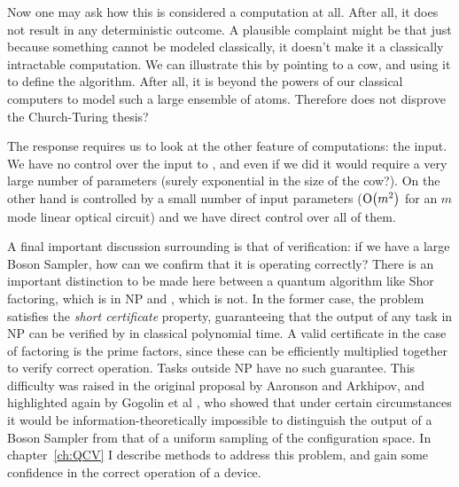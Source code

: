 Now one may ask how this is considered a computation at all.
After all, it does not result in any deterministic outcome. A plausible
complaint might be that just because something cannot be modeled classically,
it doesn't make it a classically intractable computation. We can illustrate
this by pointing to a cow, and using it to define the  algorithm.
After all, it is beyond the powers of our classical computers to model such a
large ensemble of atoms. Therefore does  not disprove the
Church-Turing thesis?

The response requires us to look at the other feature of computations: the
input. We have no control over the input to , and even if we did it
would require a very large number of parameters (surely exponential in the size
of the cow?). On the other hand \bosonsampling{} is controlled by a small number
of input parameters (\(\mathrm{O} \!\left(m^{2}\right)\) for an \(m\) mode linear optical
circuit) and we have direct control over all of them.

A final important discussion surrounding \bosonsampling{} is that of
verification: if we have a large Boson Sampler, how can we confirm that it is
operating correctly? There is an important distinction to be made here between
a quantum algorithm like Shor factoring, which is in NP and \bosonsampling{},
which is not. In the former case, the problem satisfies the \emph{short
certificate} property, guaranteeing that the output of any task in NP can be
verified by in classical polynomial time. A valid certificate in the case of
factoring is the prime factors, since these can be efficiently multiplied
together to verify correct operation. Tasks outside NP have no such guarantee.
This difficulty was raised in the original proposal by Aaronson and Arkhipov,
and highlighted again by Gogolin et al \cite{gogolin}, who showed that under
certain circumstances it would be information-theoretically impossible to
distinguish the output of a Boson Sampler from that of a uniform sampling of the
configuration space. In chapter~\ref{ch:QCV} I describe methods to address this
problem, and gain some confidence in the correct operation of a \bosonsampling{}
device.

